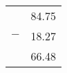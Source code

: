 \documentclass[border = 1mm]{standalone}
\begin{document}
\begin{tabular}{c r}
     &84.75 \tabularnewline
    $-$&18.27 \tabularnewline
    \hline
     &66.48 \tabularnewline
    \hline
\end{tabular}
\end{document}
